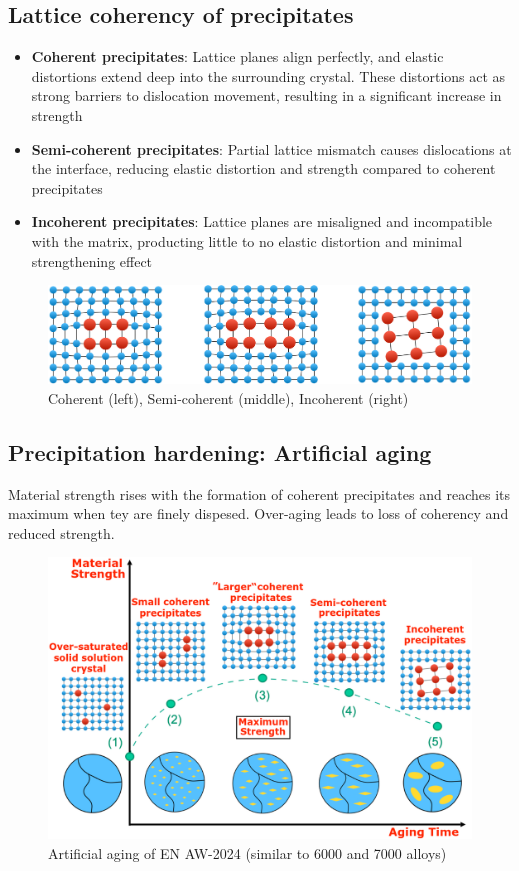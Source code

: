\documentclass{article}
\begin{document}
\subsection{Lattice coherency of precipitates}
\begin{itemize}
  \item \textbf{Coherent precipitates}: Lattice planes align perfectly, and elastic distortions extend deep into the surrounding crystal. These distortions act as strong barriers to dislocation movement, resulting in a significant increase in strength
  \item \textbf{Semi-coherent precipitates}: Partial lattice mismatch causes dislocations at the interface, reducing elastic distortion and strength compared to coherent precipitates
  \item \textbf{Incoherent precipitates}: Lattice planes are misaligned and incompatible with the matrix, producting little to no elastic distortion and minimal strengthening effect
\end{itemize}

\begin{figure}[ht!]
  \centering
  \includegraphics[width=.95\textwidth]{media/lattice_coherency.png}
  \caption*{Coherent (left), Semi-coherent (middle), Incoherent (right)}
\end{figure}

\newpage
\subsection{Precipitation hardening: Artificial aging}
Material strength rises with the formation of coherent precipitates and reaches its
maximum when tey are finely dispesed. Over-aging leads to loss of coherency and reduced
strength.

\begin{figure}[ht!]
  \centering
  \includegraphics[width=.8\textwidth]{media/artificial_aging.png}
  \caption*{Artificial aging of EN AW-2024 (similar to 6000 and 7000 alloys)}
\end{figure}
\end{document}
